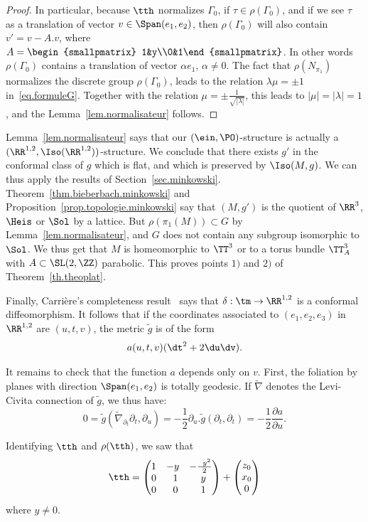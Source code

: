 \begin{proof}
In particular, because $\tth$ normalizes $\Gamma_0$, if $\tau \in \rho(\Gamma_0)$, and if we see $\tau$ as a translation of vector $v \in \Span(e_1,e_2)$, then $\rho(\Gamma_0)$ will also contain $v'=v-A.v$, where \linebreak$A=
\begin{smallpmatrix} 1&y\\0&1\end{smallpmatrix}$. In other words $\rho(\Gamma_0)$ contains a translation of vector $\alpha e_1$, $\alpha \not =0$. The fact that $\rho(N_{\pi_1})$ normalizes the discrete group $\rho(\Gamma_0)$, leads to the relation $\lambda \mu =\pm 1$ in~\eqref{eq.formuleG}. Together with the relation $\mu= \pm \frac{1}{\sqrt{|\lambda|}}$, this leads to $|\mu|=|\lambda|=1$, and the Lemma~\ref{lem.normalisateur} follows.
\end{proof}

Lemma~\ref{lem.normalisateur} says that our $(\ein,\PO)$-structure is actually a $(\RR^{1,2},\Iso(\RR^{1,2}))$-structure. We conclude that there exists $g'$ in the conformal class of $g$ which is flat, and which is preserved by $\Iso(M,g)$. We can thus apply the results of Section~\ref{sec.minkowski}. Theorem~\ref{thm.bieberbach.minkowski} and Proposition~\ref{prop.topologie.minkowski} say that $(M,g')$ is the quotient of $\RR^3$, $\Heis$ or $\Sol$ by a lattice. But $\rho(\pi_1(M)) \subset G$ by Lemma~\ref{lem.normalisateur}, and $G$ does not contain any subgroup isomorphic to $\Sol$. We thus get that $M$ is homeomorphic to $\TT^3$ or to a torus bundle $\TT_A^3$ with $A \subset \SL(2,\ZZ)$ parabolic. This proves points $1)$ and $2)$ of Theorem~\ref{th.theoplat}.



Finally, Carrière's completeness result~\cite{carriere} says that $\delta: \tm \to \RR^{1,2}$ is a conformal diffeomorphism. It follows that if the coordinates associated to $(e_1,e_2,e_3)$ in $\RR^{1,2}$ are $(u,t,v)$, the metric $\tilde{g}$ is of the form
\[
a(u,t,v)(\dt^2+2\du\dv).
\]


It remains to check that the function $a$ depends only on $v$. First, the foliation by planes with direction $\Span(e_1,e_2)$ is totally geodesic. If $\tilde{\nabla}$ denotes the Levi-Civita connection of $\tilde{g}$, we thus have:
\[
0=\tilde{g}(\tilde{\nabla}_{\partial_t}\partial_t,\partial_u)=
-\frac{1}{2}\partial_u.\tilde{g}(\partial_t,\partial_t)=
-\frac{1}{2}\frac{\partial a}{\partial u}.
\]

Identifying $\tth$ and $\rho(\tth)$, we saw that
\[
\tth=\begin{pmatrix}
1&- y&-\frac{\;\;y^2}{2 }\\ 0&\;\;1 &\;\;y\\0&\;\;0&\;\;1\\
\end{pmatrix} +
\begin{pmatrix} z_0 \\ x_0 \\ 0 \\
\end{pmatrix}
\]
where $y \not =0$.

